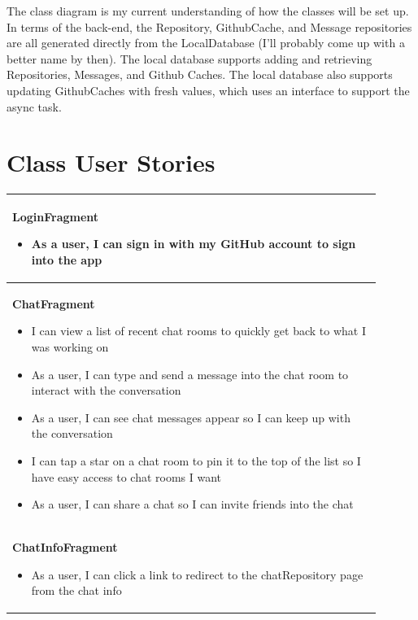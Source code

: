 \documentclass{report}
\begin{document}
The class diagram is my current understanding of how the classes will be set up. In terms of the back-end, the Repository, GithubCache, and Message repositories are all generated directly from the LocalDatabase (I'll probably come up with a better name by then). The local database supports adding and retrieving Repositories, Messages, and Github Caches. The local database also supports updating GithubCaches with fresh values, which uses an interface to support the async task.

\section{Class User Stories}

\begin{center}
    \begin{tabular}{ | p{0.9\linewidth} |}
    \hline
    \textbf{LoginFragment} \begin{itemize}
                               \item As a user, I can sign in with my GitHub account to sign into the app
                           \end{itemize}                                                       \\
    \hline
    \textbf{ChatFragment} \begin{itemize}
                              \item I can view a list of recent chat rooms to quickly get back to what I was working on
                              \item As a user, I can type and send a message into the chat room to interact with the conversation
                              \item As a user, I can see chat messages appear so I can keep up with the conversation
                              \item I can tap a star on a chat room to pin it to the top of the list so I have easy access to chat rooms I want
                              \item As a user, I can share a chat so I can invite friends into the chat
                          \end{itemize}                 \\
    \hline
    \textbf{ChatInfoFragment} \begin{itemize}
                                  \item As a user, I can click a link to redirect to the chatRepository page from the chat info

\end{itemize}
\end{tabular}
\end{center}
\end{document}
